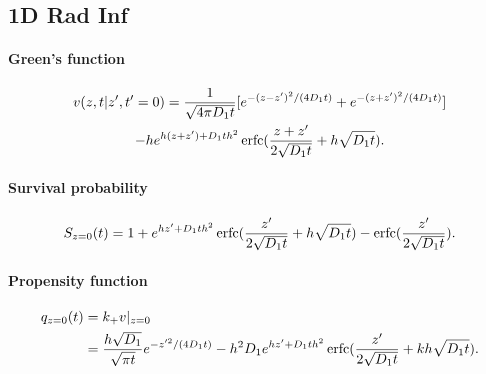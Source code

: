 
\subsection{1D Rad Inf}

\paragraph{Green's function}
\begin{multline}
  v(z,t|z',t'=0) = \frac{1}{\sqrt{4\pi D_1 t}} [
  e^{-(z-z')^2/(4 D_1 t)} +
  e^{-(z+z')^2/(4 D_1 t)} ] \\
  -h e^{h(z+z') + D_1 th^2} \operatorname{erfc}(\frac{z+z'}{2\sqrt{D_1t}} + h\sqrt{D_1t}) 
  .\label{green-promoter-solo}
\end{multline}

\paragraph{Survival probability}
\begin{align}
  S_{z=0}(t) = 1 +  e^{h z' + D_1 t h^2}
  \operatorname{erfc}(\frac{z'}{2 \sqrt{D_1 t}}  + h \sqrt{D_1 t}) -
  \operatorname{erfc}(\frac{z'}{2 \sqrt{D_1 t}}).
\end{align}

\paragraph{Propensity function}
\begin{align}
  q_{z=0}(t) &= k_+ v|_{z=0} \\
  &= \frac{h \sqrt{D_1}}{\sqrt{\pi t}} e^{-z'^2/(4 D_1 t)}  
  -h^2D_1e^{hz'+D_1th^2} \operatorname{erfc}(\frac{z'}{2\sqrt{D_1t}} + kh\sqrt{D_1t}).  
\end{align}
\begin{multline}
\end{multline}

